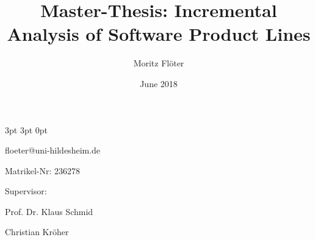 \documentclass[a4paper]{article}
\title{Master-Thesis: Incremental Analysis of Software Product Lines}
\author{Moritz Fl\"oter}
\date{June 2018}
\begin{document}


  {3pt}%
  {3pt}%
  {\normalfont}%
  {0pt}%
  {\bfseries}%
  {}%
  {\newline}%
  {}%

\theoremstyle{mystyle}


\newtheorem{req}{REQ}
\newtheorem{subreq}{REQ}[req]
\newtheorem{subsubreq}{REQ}[subreq]
\setcounter{req}{0}

\newcommand*{\reqtable}[4]{
\begin{tabular}{ | p{0.15\textwidth} | p{0.79\textwidth} | }
	\hline
	\textit{Priority} & \begin{minipage}[l]{0.79\textwidth}
	\vspace{0.25em}
		#1
	\vspace{0.25em}
	\end{minipage} \\ \hline
	\textit{Source} & \begin{minipage}[l]{0.79\textwidth}
	\vspace{0.25em}
		#2
	\vspace{0.25em}
	\end{minipage}\\ \hline
	\textit{Description} & \begin{minipage}[l]{0.79\textwidth}
	\vspace{0.25em}
		#3
	\vspace{0.25em}
	\end{minipage} \\ \hline
	\textit{Explanation} & \begin{minipage}[l]{0.79\textwidth} 
	\vspace{0.25em}
		#4
	\vspace{0.25em}
	\end{minipage} \\
	\hline
\end{tabular}
}



\maketitle
\newblock

\begin{center}
floeter@uni-hildesheim.de \par
Matrikel-Nr: 236278 \par
Supervisor: \par
Prof. Dr. Klaus Schmid \par
Christian Kr\"oher
\end{center}
\end{document}
